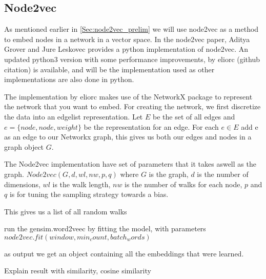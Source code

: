 \subsection{Node2vec}

As mentioned earlier in \ref{Sec:node2vec_prelim} we will use node2vec as a method to embed nodes in a network in a vector space. In the node2vec paper, Aditya Grover and Jure Leskovec provides a python implementation of node2vec. An updated python3 version with some performance improvements, by eliorc (github citation) is available, and will be the implementation used as other implementations are also done in python.

The implementation by eliorc makes use of the NetworkX package to represent the network that you want to embed. For creating the network, we first discretize the data into an edgelist representation. Let $E$ be the set of all edges and $e = \{node, node, weight\}$ be the representation for an edge. For each $e \in E$ add e as an edge to our Networkx graph, this gives us both our edges and nodes in a graph object $G$.

The Node2vec implementation have set of parameters that it takes aswell as the graph. $Node2vec(G, d, wl, nw, p, q)$ where $G$ is the graph, $d$ is the number of dimensions, $wl$ is the walk length, $nw$ is the number of walks for each node, $p$ and $q$ is for tuning the sampling strategy towards a bias.

This gives us a list of all random walks

run the gensim.word2veec by fitting the model, with parameters $node2vec.fit(window, min_count, batch_words)$

as output we get an object containing all the embeddings that were learned.

Explain result with similarity, cosine similarity